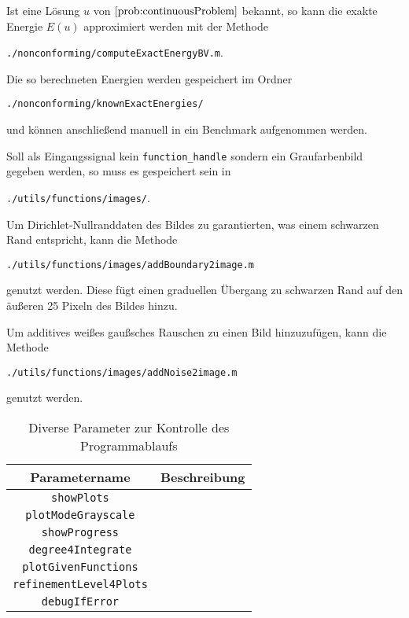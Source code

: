 Ist eine Lösung $u$ von $\Cref{prob:continuousProblem}$ bekannt, so kann die
exakte Energie $E(u)$ approximiert werden mit der Methode
\begin{center}
  \texttt{./nonconforming/computeExactEnergyBV.m}.
\end{center}
Die so berechneten Energien werden gespeichert im Ordner
\begin{center}
  \texttt{./nonconforming/knownExactEnergies/}
\end{center}
und können anschließend manuell in ein Benchmark aufgenommen werden.

Soll als Eingangssignal kein \texttt{function\_handle} sondern ein
Graufarbenbild gegeben werden, so muss es gespeichert sein in 
\begin{center}
  \texttt{./utils/functions/images/}.
\end{center}
Um Dirichlet-Nullranddaten des Bildes zu garantierten, was einem schwarzen Rand
entspricht, kann die Methode 
\begin{center}
  \texttt{./utils/functions/images/addBoundary2image.m}
\end{center}
genutzt werden. Diese fügt einen graduellen Übergang zu schwarzen Rand auf den 
äußeren 25 Pixeln des Bildes hinzu.

Um additives weißes gaußsches Rauschen zu einen Bild hinzuzufügen, kann die
Methode
\begin{center}
  \texttt{./utils/functions/images/addNoise2image.m}
\end{center}
genutzt werden. 

\begin{table}
  \centering
  \begin{tabular}{c|p{9cm}}
    \hline
    Parametername  & Beschreibung\\  
    \hline
    \texttt{showPlots} & \\
    \texttt{plotModeGrayscale} & \\
    \texttt{showProgress}& \\
    \texttt{degree4Integrate}& \\
    \texttt{plotGivenFunctions}&\\
    \texttt{refinementLevel4Plots}& \\
    \texttt{debugIfError}& \\
    \hline
  \end{tabular}
  \caption{Diverse Parameter zur Kontrolle des Programmablaufs}
  \label{tab:paramsMisc}
\end{table} 

